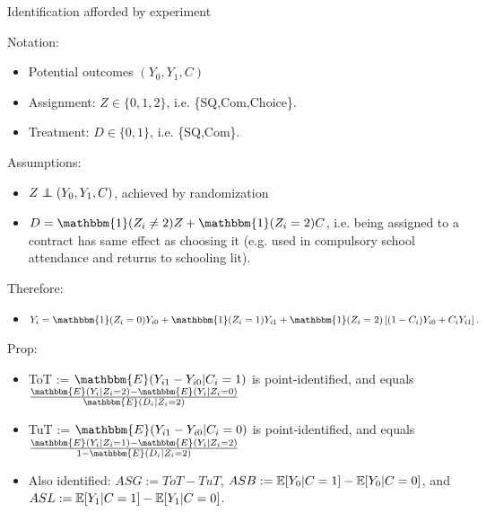 \documentclass[8pt]{beamer}
\begin{document}
 
\begin{frame}{Identification afforded by experiment}

\vspace{.2in}
Notation: 
\begin{itemize}
    \item Potential outcomes $(Y_0,Y_1,C)$
    \item Assignment: $Z \in \{0,1,2\}$, i.e. \{SQ,Com,Choice\}.  
    \item Treatment: $D \in \{0,1\} $, i.e. \{SQ,Com\}.
\end{itemize}

\vspace{.2in}
Assumptions:

\begin{itemize}
    \item $Z \independent (Y_0,Y_1,C)$, achieved by randomization
    \item $D = \mathbbm{1}(Z_i \neq 2) Z + \mathbbm{1}(Z_i=2) C$, i.e. \alert{being assigned to a contract has same effect as choosing it} (e.g. used in compulsory school attendance and returns to schooling lit).
\end{itemize}

\vspace{.2in}
Therefore:
\begin{itemize}
    \item  $Y_i = \mathbbm{1}(Z_i =0) Y_{i0} + \mathbbm{1}(Z_i = 1)  Y_{i1}  + \mathbbm{1}(Z_i = 2) \left[(1 - C_i) Y_{i0} + C_i Y_{i1} \right].$
\end{itemize}

\vspace{.2in}
Prop:
\begin{itemize}
    \item ToT := $\mathbbm{E}(Y_{i1} - Y_{i0} | C_i = 1)$ is point-identified, and equals $\frac{\mathbbm{E}(Y_i|Z_i=2) - \mathbbm{E}(Y_i|Z_i =0)}{\mathbbm{E}(D_i|Z_i=2)} $
     \item TuT := $\mathbbm{E}(Y_{i1} - Y_{i0} | C_i = 0)$ is point-identified, and equals $\frac{\mathbbm{E}(Y_i|Z_i=1) - \mathbbm{E}(Y_i|Z_i =2)}{1-\mathbbm{E}(D_i|Z_i=2)} $
     \item Also identified: $ASG:=ToT-TuT$, $ASB:= \mathbb{E}[Y_0 | C=1]-\mathbb{E}[Y_0 | C=0]$, and $ASL:= \mathbb{E}[Y_1 | C=1]-\mathbb{E}[Y_1 | C=0]$. 
\end{itemize}
\end{frame}
\end{document}

